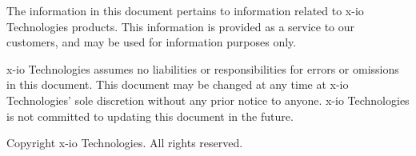 
The information in this document pertains to information related to x-io Technologies products.  This information is provided as a service to our customers, and may be used for information purposes only.

x-io Technologies assumes no liabilities or responsibilities for errors or omissions in this document.  This document may be changed at any time at x-io Technologies' sole discretion without any prior notice to anyone.  x-io Technologies is not committed to updating this document in the future.

Copyright \textcopyright{} \the\year{} x-io Technologies.  All rights reserved.
